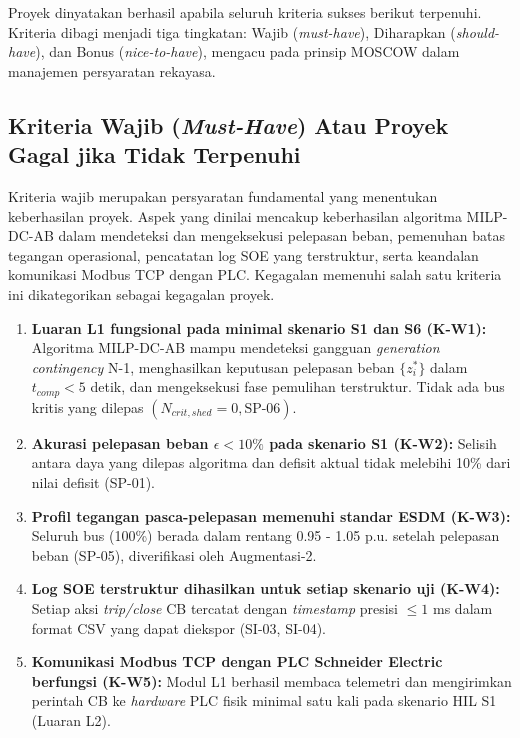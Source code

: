 Proyek dinyatakan berhasil apabila seluruh kriteria sukses berikut terpenuhi. Kriteria dibagi menjadi tiga tingkatan: Wajib (\textit{must-have}), Diharapkan (\textit{should-have}), dan Bonus (\textit{nice-to-have}), mengacu pada prinsip MOSCOW dalam manajemen persyaratan rekayasa.

\subsection{Kriteria Wajib (\textit{Must-Have}) Atau Proyek Gagal jika Tidak Terpenuhi}
\label{subsec:Kriteria_Wajib}

Kriteria wajib merupakan persyaratan fundamental yang menentukan keberhasilan proyek. Aspek yang dinilai mencakup keberhasilan algoritma MILP-DC-AB dalam mendeteksi dan mengeksekusi pelepasan beban, pemenuhan batas tegangan operasional, pencatatan log SOE yang terstruktur, serta keandalan komunikasi Modbus TCP dengan PLC. Kegagalan memenuhi salah satu kriteria ini dikategorikan sebagai kegagalan proyek.

\begin{enumerate}
    \item[a.] \textbf{Luaran L1 fungsional pada minimal skenario S1 dan S6 (K-W1):} Algoritma MILP-DC-AB mampu mendeteksi gangguan \textit{generation contingency} N-1, menghasilkan keputusan pelepasan beban $\{z_{i}^{*}\}$ dalam $t_{comp}<5$ detik, dan mengeksekusi fase pemulihan terstruktur. Tidak ada bus kritis yang dilepas $(N_{crit,shed}=0, \text{SP-06})$.
    \item[b.] \textbf{Akurasi pelepasan beban $\epsilon<10\%$ pada skenario S1 (K-W2):} Selisih antara daya yang dilepas algoritma dan defisit aktual tidak melebihi 10\% dari nilai defisit (SP-01).
    \item[c.] \textbf{Profil tegangan pasca-pelepasan memenuhi standar ESDM (K-W3):} Seluruh bus (100\%) berada dalam rentang 0.95 - 1.05 p.u. setelah pelepasan beban (SP-05), diverifikasi oleh Augmentasi-2.
    \item[d.] \textbf{Log SOE terstruktur dihasilkan untuk setiap skenario uji (K-W4):} Setiap aksi \textit{trip/close} CB tercatat dengan \textit{timestamp} presisi $\le 1$ ms dalam format CSV yang dapat diekspor (SI-03, SI-04).
    \item[e.] \textbf{Komunikasi Modbus TCP dengan PLC Schneider Electric berfungsi (K-W5):} Modul L1 berhasil membaca telemetri dan mengirimkan perintah CB ke \textit{hardware} PLC fisik minimal satu kali pada skenario HIL S1 (Luaran L2).
\end{enumerate}

